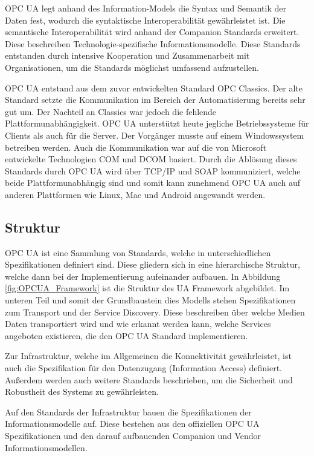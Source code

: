 \documentclass[a4paper, 12pt, oneside]{scrbook}
\begin{document}
	 OPC UA legt anhand des Information-Models die Syntax und Semantik der Daten fest, wodurch die syntaktische Interoperabilität gewährleistet ist. Die semantische Interoperabilität wird anhand der Companion Standards erweitert. Diese beschreiben Technologie-spezifische Informationsmodelle. Diese Standards entstanden durch intensive Kooperation und Zusammenarbeit mit Organisationen, um die Standards möglichst umfassend aufzustellen. \cite{mielebacher_verteilte_2021-1}
	 
	 OPC UA entstand aus dem zuvor entwickelten Standard OPC Classics. Der alte Standard setzte die Kommunikation im Bereich der Automatisierung bereits sehr gut um. Der Nachteil an Classics war jedoch die fehlende Plattformunabhängigkeit. OPC UA unterstützt heute jegliche Betriebssysteme für Clients als auch für die Server. Der Vorgänger musste auf einem Windowssystem betreiben werden. Auch die Kommunikation war auf die von Microsoft entwickelte Technologien \ac{COM} und \ac{DCOM} basiert. Durch die Ablösung dieses Standards durch OPC UA wird über TCP/IP und SOAP kommuniziert, welche beide Plattformunabhängig sind und somit kann zunehmend OPC UA auch auf anderen Plattformen wie Linux, Mac und Android angewandt werden. \cite{mielebacher_verteilte_2021-1}
	
		\subsection{Struktur}
		
		OPC UA ist eine Sammlung von Standards, welche in unterschiedlichen Spezifikationen definiert sind. Diese gliedern sich in eine hierarchische Struktur, welche dann bei der Implementierung aufeinander aufbauen. In Abbildung \ref{fig:OPCUA_Framework} ist die Struktur des UA Framework abgebildet. Im unteren Teil und somit der Grundbaustein dies Modells stehen Spezifikationen zum Transport und der Service Discovery. Diese beschreiben über welche Medien Daten transportiert wird und wie erkannt werden kann, welche Services angeboten existieren, die den OPC UA Standard implementieren. \cite{mahnke_opc_2009, rinke_was_2022}
		
		Zur Infrastruktur, welche im Allgemeinen die Konnektivität gewährleistet, ist auch die Spezifikation für den Datenzugang (Information Access) definiert. Außerdem werden auch weitere Standards beschrieben, um die Sicherheit und Robustheit des Systems zu gewährleisten.
		
		Auf den Standards der Infrastruktur bauen die Spezifikationen der Informationsmodelle auf. Diese bestehen aus den offiziellen OPC UA Spezifikationen und den darauf aufbauenden Companion und Vendor Informationsmodellen. \cite{mahnke_opc_2009}
		
\end{document}
